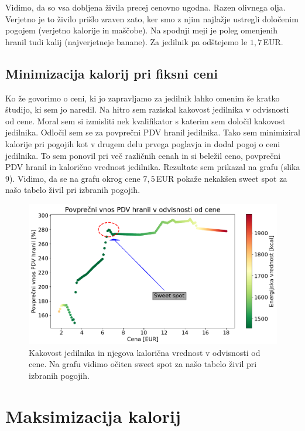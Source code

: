 \documentclass[slovene,11pt,a4paper]{article}
\begin{document}
Vidimo, da so vsa dobljena živila precej cenovno ugodna. Razen olivnega olja. Verjetno je to živilo prišlo zraven zato, ker smo z njim najlažje ustregli določenim pogojem (verjetno kalorije in maščobe). Na spodnji meji je poleg omenjenih hranil tudi kalij (najverjetneje banane). Za jedilnik pa odštejemo le $1,7\,$EUR.

\subsection{Minimizacija kalorij pri fiksni ceni}

Ko že govorimo o ceni, ki jo zapravljamo za jedilnik lahko omenim še kratko študijo, ki sem jo naredil. Na hitro sem raziskal kakovost jedilnika v odvisnosti od cene. Moral sem si izmisliti nek kvalifikator s katerim sem določil kakovost jedilnika. Odločil sem se za povprečni PDV hranil jedilnika. Tako sem minimiziral kalorije pri pogojih kot v drugem delu prvega poglavja in dodal pogoj o ceni jedilnika. To sem ponovil pri več različnih cenah in si beležil ceno, povprečni PDV hranil in kalorično vrednost jedilnika. Rezultate sem prikazal na grafu (slika 9). Vidimo, da se na grafu okrog cene $7,5\,$EUR pokaže nekakšen sweet spot za našo tabelo živil pri izbranih pogojih.

\begin{figure}[h!]
\centering
\includegraphics[width=14cm]{sweet.png}
\caption{Kakovost jedilnika in njegova kalorična vrednost v odvisnosti od cene. Na grafu vidimo očiten sweet spot za našo tabelo živil pri izbranih pogojih.}
\end{figure}

\section{Maksimizacija kalorij}
\end{document}
